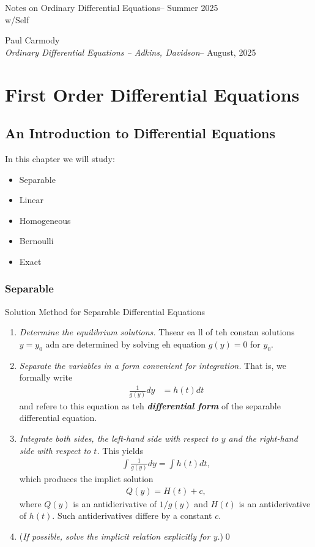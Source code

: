 \documentclass[12pt,a4paper]{report}
\newcommand{\CLASSNAME}{Notes on Ordinary Differential Equations}
\newcommand{\STUDENTNAME}{Paul Carmody}
\newcommand{\ASSIGNMENT}{\textit{Ordinary Differential Equations -- Adkins, Davidson}}
\newcommand{\DUEDATE}{August, 2025}
\newcommand{\PROFESSOR}{Self}
\newcommand{\SEMESTER}{Summer 2025}
\begin{document}
\begin{center}
	\Large{\CLASSNAME -- \SEMESTER} \\
	\large{ w/\PROFESSOR}
\end{center}
\begin{center}
	\STUDENTNAME \\
	\ASSIGNMENT -- \DUEDATE\\
\end{center} 

\chapter{First Order Differential Equations}

\section{An Introduction to Differential Equations}

In this chapter we will study:
\begin{itemize}
\item Separable
\item Linear
\item Homogeneous
\item Bernoulli
\item Exact
\end{itemize}

\subsection{Separable}

\begin{center}
	\large{ Solution Method for Separable Differential Equations}
\end{center}

\begin{enumerate}
	\item \textit{Determine the equilibrium solutions.}  Thsear ea ll of teh constan solutions $y=y_0$ adn are determined by solving eh equation $g(y)=0$ for $y_0$.
	\item \textit{Separate the variables in a form convenient for integration.}  That is, we formally write
	\begin{align*}
		\frac{1}{g(y)}dy &= h(t)dt
	\end{align*}and refere to this equation as teh \textbf{\textit{differential form}} of the separable differential equation.
	\item \textit{Integrate both sides, the left-hand side with respect to $y$ and the right-hand side with respect to $t$.}  This yields
	\begin{align*}
		\int \frac{1}{g(y)}dy = \int h(t) dt,
	\end{align*}which produces the implict solution
	\begin{align*}
		Q(y) = H(t)+c,
	\end{align*}where $Q(y)$ is an antidierivative of $1/g(y)$ and $H(t)$ is an antiderivative of $h(t)$.  Such antiderivatives differe by a constant $c$.
	\item (\textit{If possible, solve the implicit relation explicitly for y.})\qed
\end{enumerate}
\end{document}
